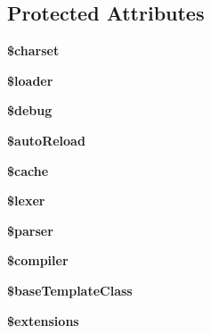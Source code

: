 \subsection*{Protected Attributes}
\begin{DoxyCompactItemize}
\item 
\hypertarget{class_twig___environment_af10158dd74b75f1d337e83102d6b82ce}{}{\bfseries \$charset}\label{class_twig___environment_af10158dd74b75f1d337e83102d6b82ce}

\item 
\hypertarget{class_twig___environment_ab832f4c463ee1c9ba2e9464265f7ea3b}{}{\bfseries \$loader}\label{class_twig___environment_ab832f4c463ee1c9ba2e9464265f7ea3b}

\item 
\hypertarget{class_twig___environment_a85ae3e64cd40e9564adceb010085e9dd}{}{\bfseries \$debug}\label{class_twig___environment_a85ae3e64cd40e9564adceb010085e9dd}

\item 
\hypertarget{class_twig___environment_ae887a6f4d0cf24eed29e4202ed82f559}{}{\bfseries \$auto\+Reload}\label{class_twig___environment_ae887a6f4d0cf24eed29e4202ed82f559}

\item 
\hypertarget{class_twig___environment_ac2dc76d756ec398393d4b1d23659276c}{}{\bfseries \$cache}\label{class_twig___environment_ac2dc76d756ec398393d4b1d23659276c}

\item 
\hypertarget{class_twig___environment_a63508a0b3a11f514f2b2124f99a05baf}{}{\bfseries \$lexer}\label{class_twig___environment_a63508a0b3a11f514f2b2124f99a05baf}

\item 
\hypertarget{class_twig___environment_a147a766daa03d52576c7345fea31c945}{}{\bfseries \$parser}\label{class_twig___environment_a147a766daa03d52576c7345fea31c945}

\item 
\hypertarget{class_twig___environment_a8e5d240701ad41cd982ea35d9acd9ab7}{}{\bfseries \$compiler}\label{class_twig___environment_a8e5d240701ad41cd982ea35d9acd9ab7}

\item 
\hypertarget{class_twig___environment_a98b0e83a8f37e0143916958db3aa8283}{}{\bfseries \$base\+Template\+Class}\label{class_twig___environment_a98b0e83a8f37e0143916958db3aa8283}

\item 
\hypertarget{class_twig___environment_a78dd0f5a8f983099dc6499a2d7cdf7aa}{}{\bfseries \$extensions}\label{class_twig___environment_a78dd0f5a8f983099dc6499a2d7cdf7aa}


\end{DoxyCompactItemize}
